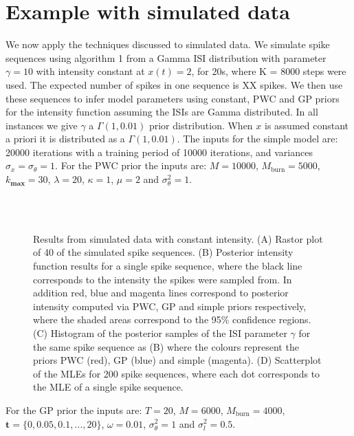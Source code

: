 \documentclass[../main.tex]{subfiles}
\begin{document}
\section{Example with simulated data}
We now apply the techniques discussed to simulated data. We simulate spike sequences using algorithm 1 from a Gamma ISI distribution with parameter $\gamma = 10$ with intensity constant at $x(t) = 2$, for 20s, where K = 8000 steps were used. The expected number of spikes in one sequence is XX spikes. We then use these sequences to infer model parameters using constant, PWC and GP priors for the intensity function assuming the ISIs are Gamma distributed. In all instances we give $\gamma$ a $\Gamma(1,0.01)$ prior distribution. When $x$ is assumed constant a priori it is distributed as a $\Gamma(1,0.01)$. The inputs for the simple model are: 20000 iterations with a training period of 10000 iterations, and variances $\sigma_x = \sigma_\theta = 1$.  
For the PWC prior the inputs are: $M=10000$, $M_{\mathrm{burn}}=5000$, $k_{\mathbf{max}}=30$, $\lambda=20$, $\kappa=1$, $\mu=2$ and $\sigma^2_\theta = 1$.
\begin{figure}[h]
\hrulefill
\begin{center} 
 \qquad
{}  \\
 \qquad
{}  \\
\end{center}     
\caption{Results from simulated data with constant intensity. (A) Rastor plot of 40 of the simulated spike sequences. (B) Posterior intensity function results for a single spike sequence, where the black line corresponds to the intensity the spikes were sampled from. In addition red, blue and magenta lines correspond to posterior intensity computed via PWC, GP and simple priors respectively, where the shaded areas correspond to the 95\% confidence regions. (C) Histogram of the posterior samples of the ISI parameter $\gamma$ for the same spike sequence as (B) where the colours represent the priors PWC (red), GP (blue) and simple (magenta). (D) Scatterplot of the MLEs for 200 spike sequences, where each dot corresponds to the MLE of a single spike sequence.}
\hrulefill
\label{fig:ResultsSimple}
\end{figure}

For the GP prior the inputs are: $T=20$, $M=6000$, $M_{\mathrm{burn}}=4000$, $\mathbf{t} = \{0,0.05,0.1, \dots, 20 \} $, $\omega = 0.01$, $\sigma^2_\theta = 1$ and $\sigma^2_l = 0.5$. 
\end{document}
